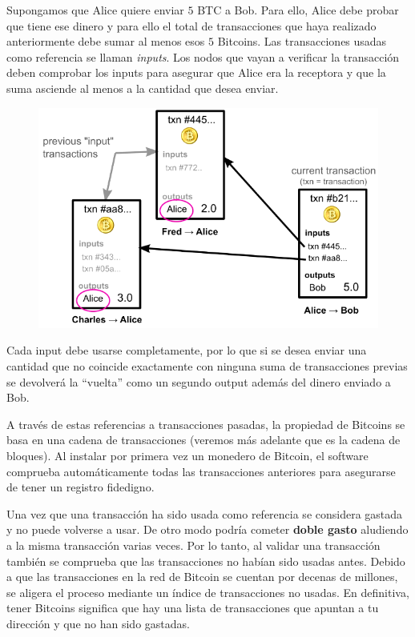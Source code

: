 \documentclass[twoside]{article}
\theoremstyle{definition}
\begin{document}
Supongamos que Alice quiere enviar $5$ BTC a Bob. Para ello, Alice debe probar que tiene ese dinero y para ello el total de transacciones que haya realizado anteriormente debe sumar al menos esos $5$ Bitcoins. Las transacciones usadas como referencia se llaman \emph{inputs}. Los nodos que vayan a verificar la transacción deben comprobar los inputs para asegurar que Alice era la receptora y que la suma asciende al menos a la cantidad que desea enviar.
\begin{figure}[h!]
\includegraphics[scale=0.4]{inputs}
\end{figure}

Cada input debe usarse completamente, por lo que si se desea enviar una cantidad que no coincide exactamente con ninguna suma de transacciones previas se devolverá la ``vuelta'' como un segundo output además del dinero enviado a Bob. 

A través de estas referencias a transacciones pasadas, la propiedad de Bitcoins se basa en una cadena de transacciones (veremos más adelante que es la cadena de bloques). Al instalar por primera vez un monedero de Bitcoin, el software comprueba automáticamente todas las transacciones anteriores para asegurarse de tener un registro fidedigno.

Una vez que una transacción ha sido usada como referencia se considera gastada y no puede volverse a usar. De otro modo podría cometer \textbf{doble gasto} aludiendo a la misma transacción varias veces. Por lo tanto, al validar una transacción también se comprueba que las transacciones no habían sido usadas antes. Debido a que las transacciones en la red de Bitcoin se cuentan por decenas de millones, se aligera el proceso mediante un índice de transacciones no usadas. En definitiva, tener Bitcoins significa que hay una lista de transacciones que apuntan a tu dirección y que no han sido gastadas.
\end{document}
